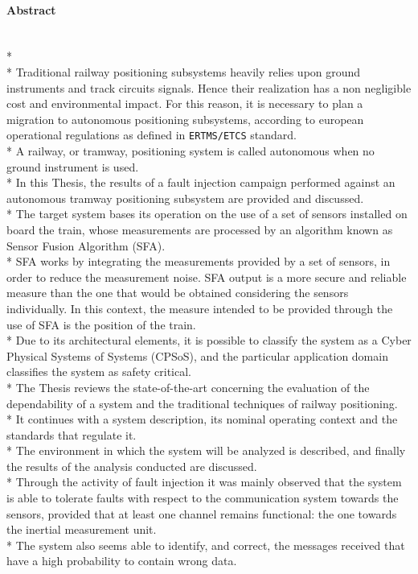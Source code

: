 \paragraph{Abstract}\mbox{}\\*\\*
Traditional railway positioning subsystems heavily relies upon ground instruments and track circuits signals. Hence their realization has a non negligible cost and environmental impact. For this reason, it is necessary to plan a migration to autonomous positioning subsystems, according to european operational regulations as defined in \texttt{ERTMS/ETCS} standard.\\*
A railway, or tramway, positioning system is called autonomous when no ground instrument is used.\\*
In this Thesis, the results of a fault injection campaign performed against an autonomous tramway positioning subsystem are provided and discussed.\\*
The target system bases its operation on the use of a set of sensors installed on board the train, whose measurements are processed by an algorithm known as Sensor Fusion Algorithm (SFA).\\*
SFA works by integrating the measurements provided by a set of sensors, in order to reduce the measurement noise. SFA output is a more secure and reliable measure than the one that would be obtained considering the sensors individually. In this context, the measure intended to be provided through the use of SFA is the position of the train.\\*
Due to its architectural elements, it is possible to classify the system as a Cyber Physical Systems of Systems (CPSoS), and the particular application domain classifies the system as safety critical.\\*
The Thesis reviews the state-of-the-art concerning the evaluation of the dependability of a system and the traditional techniques of railway positioning.\\* It continues with a system description, its nominal operating context and the standards that regulate it.\\*
The environment in which the system will be analyzed is described, and finally the results of the analysis conducted are discussed.\\*
Through the activity of fault injection it was mainly observed that the system is able to tolerate faults with respect to the communication system towards the sensors, provided that at least one channel remains functional: the one towards the inertial measurement unit.\\*
The system also seems able to identify, and correct, the messages received that have a high probability to contain wrong data.
